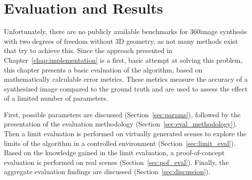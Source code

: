\chapter{Evaluation and Results} \label{chap:evaluation}
Unfortunately, there are no publicly available benchmarks for 360\degree image synthesis with two degrees of freedom without 3D geometry, as not many methods exist that try to achieve this. Since the approach presented in Chapter~\ref{chap:implementation} is a first, basic attempt at solving this problem, this chapter presents a basic evaluation of the algorithm, based on mathematically calculable error metrics. These metrics measure the accuracy of a synthesized image compared to the ground truth and are used to assess the effect of a limited number of parameters.

First, possible parameters are discussed (Section~\ref{sec:params}), followed by the presentation of the evaluation methodology (Section~\ref{sec:eval_methodology}). Then a limit evaluation is performed on virtually generated scenes to explore the limits of the algorithm in a controlled environment (Section~\ref{sec:limit_eval}). Based on the knowledge gained in the limit evaluation, a proof-of-concept evaluation is performed on real scenes (Section~\ref{sec:pof_eval}). Finally, the aggregate evaluation findings are discussed (Section~\ref{sec:discussion}).



